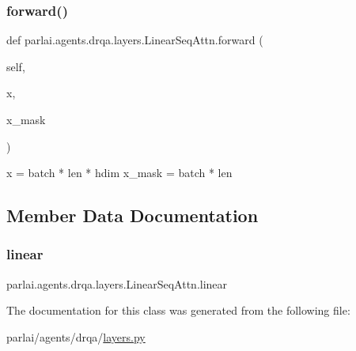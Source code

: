 \subsubsection{\texorpdfstring{forward()}{forward()}}
{\footnotesize\ttfamily def parlai.\+agents.\+drqa.\+layers.\+Linear\+Seq\+Attn.\+forward (\begin{DoxyParamCaption}\item[{}]{self,  }\item[{}]{x,  }\item[{}]{x\+\_\+mask }\end{DoxyParamCaption})}

\begin{DoxyVerb}x = batch * len * hdim
x_mask = batch * len
\end{DoxyVerb}
 

\subsection{Member Data Documentation}
\mbox{\label{classparlai_1_1agents_1_1drqa_1_1layers_1_1LinearSeqAttn_a5e221c809306db7c5877e5f6f919ac7f}} 
\subsubsection{\texorpdfstring{linear}{linear}}
{\footnotesize\ttfamily parlai.\+agents.\+drqa.\+layers.\+Linear\+Seq\+Attn.\+linear}



The documentation for this class was generated from the following file\+:\begin{DoxyCompactItemize}
\item 
parlai/agents/drqa/\hyperlink{layers_8py}{layers.\+py}\end{DoxyCompactItemize}
